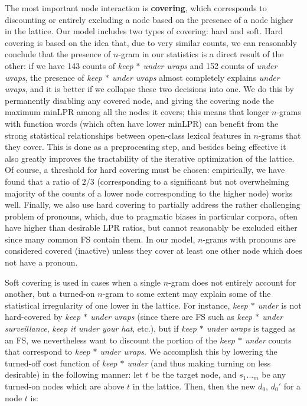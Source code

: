\documentclass[11pt]{article}
\makeatletter
\def \etc {etc.\@ }
\newcommand{\dotts}{...}
\newcommand{\gap}{$*$\xspace}
\newcommand{\ex}[1]{\textit{#1}\xspace}
\newcommand{\termdef}[1]{\textbf{#1}\xspace}
\makeatother
\begin{document}
The most important node interaction is \termdef{covering}, which corresponds to discounting or entirely excluding a node based on the presence of a node higher in the lattice. Our model includes two types of covering: hard and soft. Hard covering is based on the idea that, due to very similar counts, we can reasonably conclude that the presence of $n$-gram in our statistics is a direct result of the other: if we have 143 counts of \ex{keep \gap under wraps} and 152 counts of \ex{under wraps}, the presence of \ex{keep \gap under wraps} almost completely explains \ex{under wraps}, and it is better if we collapse these two decisions into one. We do this by permanently disabling any covered node, and giving the covering node the maximum minLPR among all the nodes it covers; this means that longer $n$-grams with function words (which often have lower minLPR) can benefit from the strong statistical relationships between open-class lexical features in $n$-grams that they cover. This is done as a preprocessing step, and besides being effective it also greatly improves the tractability of the iterative optimization of the lattice. Of course, a threshold for hard covering must be chosen: empirically, we have found that a ratio of $2/3$ (corresponding to a significant but not overwhelming majority of the counts of a lower node corresponding to the higher node) works well. Finally, we also use hard covering to partially address the rather challenging problem of pronouns, which, due to pragmatic biases in particular corpora, often have higher than desirable LPR ratios, but cannot reasonably be excluded either since many common FS contain them. In our model, $n$-grams with pronouns are considered covered (inactive) unless they cover at least one other node which does not have a pronoun.

Soft covering is used in cases when a single $n$-gram does not entirely account for another, but a turned-on $n$-gram to some extent may explain some of the statistical irregularity of one lower in the lattice. For instance, \ex{keep \gap under} is not hard-covered by \ex{keep \gap under wraps} (since there are FS such as \ex{keep \gap under surveillance}, \ex{keep it under your hat}, \etc), but if \ex{keep \gap under wraps} is tagged as an FS, we nevertheless want to discount the portion of the \ex{keep \gap under} counts that correspond to \ex{keep \gap under wraps}. We accomplish this by lowering the turned-off cost function of \ex{keep \gap under} (and thus making turning on less desirable) in the following manner: let $t$ be the target node, and $s_1\dotts_m$ be any turned-on nodes which are above $t$ in the lattice. Then, then the new $d_0$, $d_0'$ for a node $t$ is:
\end{document}
